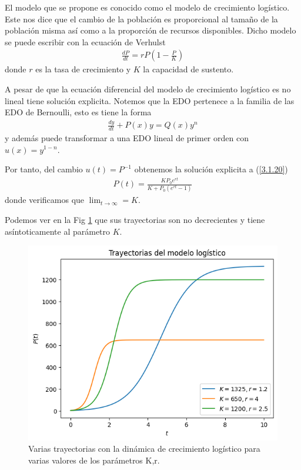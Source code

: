 El modelo que se propone es conocido como el modelo de crecimiento logístico. Este nos dice que el cambio de la población es proporcional al tamaño de la población misma así como a la proporción de recursos disponibles. Dicho modelo se puede escribir con la ecuación de Verhulst 
\begin{align}
    \frac{dP}{dt} = rP\left(1- \frac{P}{K}  \right)
\end{align}
donde $r$ es la tasa de crecimiento y $K$ la capacidad de sustento.

A pesar de que la ecuación diferencial del modelo de crecimiento logístico es no lineal tiene solución explicita. Notemos que la EDO pertenece a la familia de las EDO de Bernoulli, esto es tiene la forma
\begin{align*}
    \frac{dy}{dt} + P(x) y =Q(x) y^n
\end{align*}
y además puede transformar a una EDO lineal de primer orden con $u(x) = y ^{1-n}$.

Por tanto, del cambio $u(t) = P^{-1}$ obtenemos la solución explicita a (\ref{3.1.20})
\begin{align}
    P(t) = \frac{KP_0 e^{rt}}{K + P_0 \left(e^{rt}-1\right)}    
\end{align}
donde verificamos que $\lim_{t \rightarrow \infty} = K $. 

Podemos ver en la Fig \ref{fig:trayectoria_logistico} que sus trayectorias son no decrecientes y tiene asíntoticamente al parámetro $K$.


\begin{figure}
    \centering
    \includegraphics[width = 10 cm]{img/trayectoria_log.png}
    \caption{Varias trayectorias con la dinámica de crecimiento logístico para varias valores de los parámetros K,r.}
    \label{fig:trayectoria_logistico}
\end{figure}



